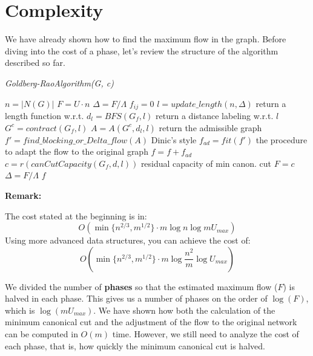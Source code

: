 \section{Complexity}
    We have already shown how to find the maximum flow in the graph.
    Before diving into the cost of a phase, let's review the structure of the algorithm described so far.

    \begin{algorithm}
        \caption{\textit{Goldberg-RaoAlgorithm(G, c)}}
        \label{GoldbergRao}
        \begin{algorithmic}[1]
            \State $n = |N(G)|$
            \State $F = U\cdot n$
            \State $\Delta = F/ \Lambda$
                $f_{ij} = 0$
            \EndFor
                \State $l = update\_length(n, \Delta)$ \Comment return a length function w.r.t. \dlt
                \State $d_l = BFS(G_f, l)$ \Comment return a distance labeling w.r.t. $l$
                \State $G^c = contract(G_f, l)$ 
                \State $A = A(G^c, d_l, l)$ \Comment return the admissible graph
                \State $f' = find\_blocking\_or\_Delta\_flow(A)$ \Comment Dinic's style 
                \State $f_{ad} = fit(f')$ \Comment the procedure to adapt the flow to the original graph
                \State $f = f + f_{ad}$
                \State $c = r(canCutCapacity(G_f,d, l))$ \Comment residual capacity of min canon. cut 
                    \State $F = c$
                    \State $\Delta = F/\Lambda$
                \EndIf
            \EndWhile 
            \State \Return $f$
        \end{algorithmic}
    \end{algorithm}

\textbf{Remark:}
        
        The cost stated at the beginning is in:
        \[O(\min \{n^{2/3}, m^{1/2}\}\cdot m \log n\log m U_{max})\]
        Using more advanced data structures, you can achieve the cost of:
        \[O(\min \{n^{2/3}, m^{1/2}\}\cdot m \log \frac{n^2}{m}\log U_{max})\]


      
        
    We divided the number of \textbf{phases} so that the estimated maximum flow (\( F \)) is halved in each phase.  
    This gives us a number of phases on the order of \( \log(F) \), which is \( \log(m U_{max}) \).  
    We have shown how both the calculation of the minimum canonical cut and the adjustment of the flow to the original network can be computed in \( O(m) \) time.  
    However, we still need to analyze the cost of each phase, that is, how quickly the minimum canonical cut is halved.
    
